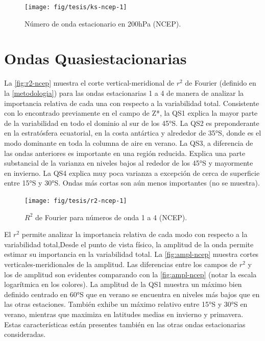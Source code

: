 \documentclass[spanish,a4paper,12pt,oneside]{book}
\begin{document}
\begin{landscape}\begin{figure}

{\centering \texttt{[image: fig/tesis/ks-ncep-1]} 

}

\caption{Número de onda estacionario en 200hPa (NCEP).}\label{fig:ks-ncep}
\end{figure}
\end{landscape}

\section{Ondas Quasiestacionarias}\label{ondas-quasiestacionarias}

La \autoref{fig:r2-ncep} muestra el corte vertical-meridional de \(r^2\)
de Fourier (definido en la \autoref{metodologia}) para las ondas
estacionarias 1 a 4 de manera de analizar la importancia relativa de
cada una con respecto a la variabilidad total. Consistente con lo
encontrado previamente en el campo de Z*, la QS1 explica la mayor parte
de la variabilidad en todo el dominio al sur de los 45°S. La QS2 es
preponderante en la estratósfera ecuatorial, en la costa antártica y
alrededor de 35°S, donde es el modo dominante en toda la columna de aire
en verano. La QS3, a diferencia de las ondas anteriores es importante en
una región reducida. Explica una parte substancial de la varianza en
niveles bajos al rededor de los 45°S y mayormente en invierno. La QS4
explica muy poca varianza a excepción de cerca de superficie entre 15°S
y 30°S. Ondas más cortas son aún menos importantes (no se muestra).

\begin{landscape}\begin{figure}

{\centering \texttt{[image: fig/tesis/r2-ncep-1]} 

}

\caption{$R^2$ de Fourier para números de onda 1 a 4 (NCEP).}\label{fig:r2-ncep}
\end{figure}
\end{landscape}

El \(r^2\) permite analizar la importancia relativa de cada modo con
respecto a la variabilidad total,Desde el punto de vista físico, la
amplitud de la onda permite estimar su importancia en la variabilidad
total. La \autoref{fig:ampl-ncep} muestra cortes verticales-meridionales
de la amplitud. Las diferencias entre los campos de \(r^2\) y los de
amplitud son evidentes comparando con la \autoref{fig:ampl-ncep} (notar
la escala logarítmica en los colores). La amplitud de la QS1 muestra un
máximo bien definido centrado en 60°S que en verano se encuentra en
niveles más bajos que en las otras estaciones. También exhibe un máximo
relativo entre 15°S y 30°S en verano, mientras que maximiza en latitudes
medias en invierno y primavera. Estas características están presentes
también en las otras ondas estacionarias consideradas.
\end{document}
